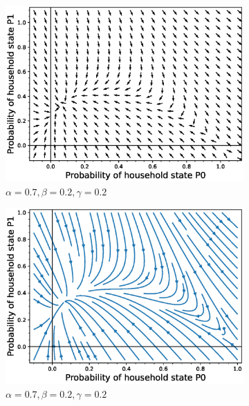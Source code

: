 \documentclass[paper=a4, fontsize=11pt, twoside, BCOR=12mm, parskip=full, listof=totoc]{scrreprt}
\begin{document}
{\begin{figure}[H]
\begin{subfigure}[b]{0.4\linewidth}
	  \includegraphics[width=\linewidth]{phase_portrait/031_g4.eps}
	  \caption{\(\alpha=0.7, \beta=0.2, \gamma=0.2\)}
	  \label{alpha seven phasevectorfield}
	\end{subfigure}
    \begin{subfigure}[b]{0.4\linewidth}
	  \includegraphics[width=\linewidth]{phase_portrait/031_g4s.eps}
	  \caption{\(\alpha=0.7, \beta=0.2, \gamma=0.2\)}
	  \label{alpha seven phasestreamplot}
	\end{subfigure}
	\begin{subfigure}[b]{0.4\linewidth}

\end{subfigure}
\end{figure}}
\end{document}
